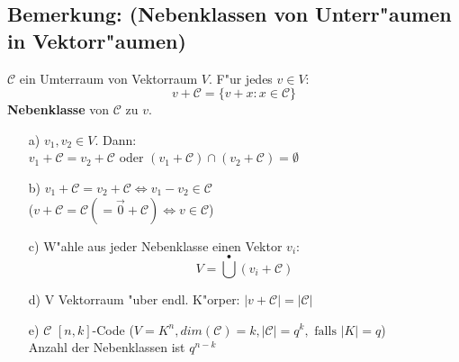 \subsection{Bemerkung: (Nebenklassen von Unterr"aumen in Vektorr"aumen)}
$\mathcal{C}$ ein Umterraum von Vektorraum $V$. F"ur jedes $v \in V$:
\[
	v + \mathcal{C} = \lbrace v+x : x \in \mathcal{C} \rbrace
\]
\textbf{Nebenklasse} von $\mathcal{C}$ zu $v$.
\begin{itemize}
	\item[a)] $v_1,v_2 \in V$. Dann: \\
					$v_1 + \mathcal{C} = v_2 + \mathcal{C}$ oder $(v_1 + \mathcal{C}) \cap (v_2 + \mathcal{C}) = \emptyset$
	\item[b)] $v_1 + \mathcal{C} = v_2 + \mathcal{C} \Leftrightarrow v_1-v_2 \in \mathcal{C}$\\
						($v+ \mathcal{C} = \mathcal{C} (=\vec{0}+\mathcal{C}) \Leftrightarrow v \in \mathcal{C}$)
	\item[c)] W"ahle aus jeder Nebenklasse einen Vektor $v_i$:
	\[
			V=\bigcup^{\bullet} (v_i + \mathcal{C})
	\]
	\item[d)] V Vektorraum "uber endl. K"orper: $\left| v + \mathcal{C} \right| = \left| \mathcal{C} \right|$
	\item[e)] $\mathcal{C}$ $[n,k]$-Code ($V=K^n, dim(\mathcal{C})=k,\left|\mathcal{C}\right|=q^k, \text{ falls } \left|K\right|=q$) \\
						Anzahl der Nebenklassen ist $q^{n-k}$
\end{itemize}

